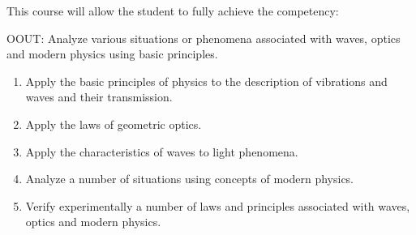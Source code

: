 {This course will allow the student to fully achieve the competency:

OOUT:  Analyze various situations or phenomena associated with waves, optics and modern physics using basic principles.
\begin{enumerate}
\item Apply the basic principles of physics to the description of vibrations and waves and their transmission.
\item Apply the laws of geometric optics.
\item Apply the characteristics of waves to light phenomena.
\item Analyze a number of situations using concepts of modern physics.
\item Verify experimentally a number of laws and principles associated with waves, optics and modern physics.
\end{enumerate}

%
}
